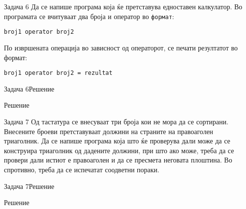 \begin{frame}[fragile]{Задача 6}
Да се напише програма која ќе претставува едноставен калкулатор. Во програмата
се вчитуваат два броја и оператор во \texttt{формат}:
\begin{center}
\texttt{broj1 operator broj2}
\end{center}
По извршената операција во зависност од операторот, се печати резултатот во формат:
\begin{center}
\texttt{broj1 operator broj2 = rezultat}
\end{center}
\end{frame}

\begin{frame}[fragile]{Задача 6}{Решение}
	\begin{exampleblock}{Решение}
	
	\end{exampleblock}
\end{frame}


\begin{frame}[fragile]{Задача 7}
Од тастатура се внесуваат три броја кои не мора да се сортирани. Внесените
броеви претставуваат должини на страните на правоаголен триаголник. Да се напише
програма која што ќе проверува дали може да се конструира триаголник од дадените
должини, при што ако може, треба да се провери дали истиот е правоаголен и да се
пресмета неговата плоштина. Во спротивно, треба да се испечатат соодветни
пораки.
\end{frame}


\begin{frame}[fragile]{Задача 7}{Решение}
	\begin{exampleblock}{Решение}
	
	\end{exampleblock}
\end{frame}


